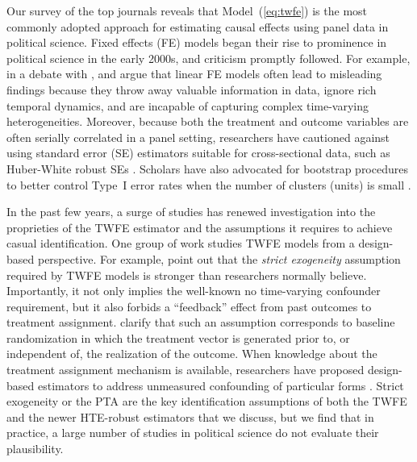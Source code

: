 \documentclass[12pt]{article}
\begin{document}
Our survey of the top journals reveals that Model~(\ref{eq:twfe}) is the most commonly adopted approach for estimating causal effects using panel data in political science. Fixed effects (FE) models began their rise to prominence in political science in the early 2000s, and criticism promptly followed. 
For example, in a debate with
\citet{Green2001-dy}, \citet{Beck2001-as} and \citet{King2001-br} argue that
linear FE models often lead to misleading findings because they throw away
valuable information in data, ignore rich temporal dynamics, and are incapable
of capturing complex time-varying heterogeneities. Moreover, because both
the treatment and outcome variables are often serially correlated in a panel setting, researchers have cautioned against using standard error (SE) estimators suitable for cross-sectional data, such as Huber-White robust SEs \citep{Bertrand2004-rc}. Scholars have also advocated for bootstrap procedures to better control Type~I error rates when the number of clusters (units) is small \citep{Cameron2008-ou}.


In the past few years, a surge of studies has renewed investigation into the proprieties of the TWFE estimator and the assumptions it requires to achieve casual identification. One group of work studies TWFE models from a design-based perspective. For example, \citet{Imai2019-nw} point out that the \textit{strict
exogeneity} assumption required by TWFE models is stronger than researchers normally believe. Importantly, it not only implies the well-known no time-varying confounder requirement, but it also forbids a ``feedback'' effect from past outcomes to treatment assignment. \citet{Blackwell2018-br} clarify that such an assumption corresponds to baseline randomization in which the treatment vector is generated prior to, or independent of, the realization of the outcome. When knowledge about the treatment assignment mechanism is available, researchers have proposed design-based estimators to address unmeasured confounding of particular forms \citep[e.g.,][]{Arkhangelsky2019-zl, Arkhangelsky2021-ti}. Strict exogeneity or the PTA are the key identification assumptions of both the TWFE and the newer HTE-robust estimators that we discuss, but we find that in practice, a large number of studies in political science do not evaluate their plausibility. 
\end{document}
